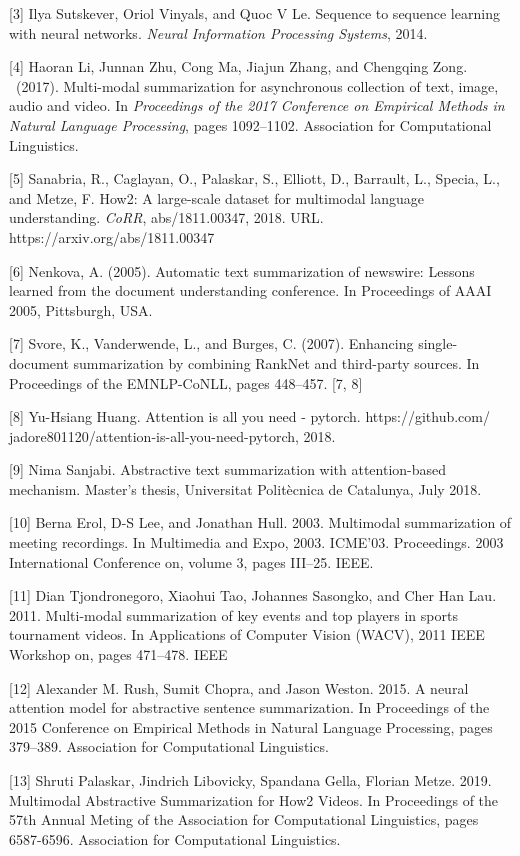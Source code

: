 \documentclass{article}
\begin{document}
[3] Ilya Sutskever, Oriol Vinyals, and Quoc V Le. Sequence to sequence learning with neural networks.
 {\it Neural Information Processing Systems}, 2014. 

[4] Haoran Li, Junnan Zhu, Cong Ma, Jiajun Zhang, and Chengqing Zong. \ (2017). Multi-modal summarization for
asynchronous collection of text, image, audio and video. In {\it Proceedings of the 2017 Conference on Empirical
Methods in Natural Language Processing}, pages 1092–1102. Association for Computational Linguistics.

[5] Sanabria, R., Caglayan, O., Palaskar, S., Elliott, D., Barrault, L., Specia, L., and Metze, F. How2: A large-scale dataset for multimodal language understanding. {\it CoRR}, abs/1811.00347, 2018. URL. https://arxiv.org/abs/1811.00347

[6] Nenkova, A. (2005). Automatic text summarization of newswire: Lessons learned from the document understanding conference. In Proceedings of AAAI 2005, Pittsburgh, USA.

[7] Svore, K., Vanderwende, L., and Burges, C. (2007). Enhancing single-document summarization by combining RankNet and third-party sources. In Proceedings of the EMNLP-CoNLL, pages 448–457. [7, 8] 

[8] Yu-Hsiang Huang. Attention is all you need - pytorch. https://github.com/ jadore801120/attention-is-all-you-need-pytorch, 2018.

[9] Nima Sanjabi. Abstractive text summarization with attention-based mechanism. Master’s thesis, Universitat Politècnica de Catalunya, July 2018.

[10] Berna Erol, D-S Lee, and Jonathan Hull. 2003. Multimodal summarization of meeting recordings. In Multimedia and Expo, 2003. ICME’03. Proceedings. 2003 International Conference on, volume 3, pages III–25. IEEE.

[11] Dian Tjondronegoro, Xiaohui Tao, Johannes Sasongko, and Cher Han Lau. 2011. Multi-modal summarization of key events and top players in sports tournament videos. In Applications of Computer Vision (WACV), 2011 IEEE Workshop on, pages 471–478. IEEE

[12] Alexander M. Rush, Sumit Chopra, and Jason Weston. 2015. A neural attention model for abstractive sentence summarization. In Proceedings of the 2015 Conference on Empirical Methods in Natural Language Processing, pages 379–389. Association for Computational Linguistics.

[13] Shruti Palaskar, Jindrich Libovicky, Spandana Gella, Florian Metze. 2019. Multimodal Abstractive Summarization for How2 Videos. In Proceedings of the 57th Annual Meting of the Association for Computational Linguistics, pages 6587-6596. Association for Computational Linguistics.
\end{document}
